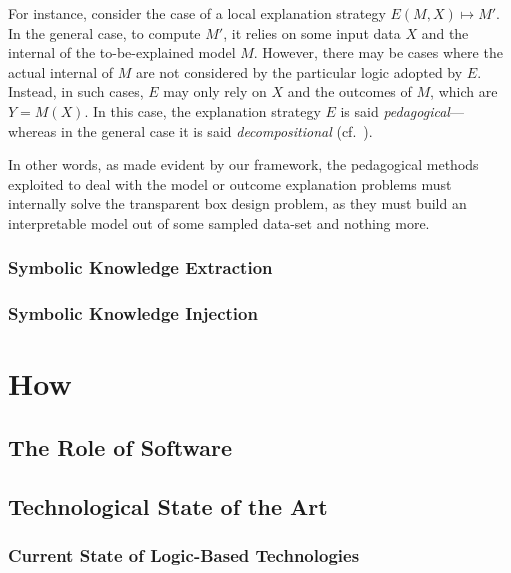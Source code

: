 \documentclass[12pt,a4paper,openright,twoside]{book}
\begin{document}
For instance, consider the case of a local explanation strategy $E(M, X) \mapsto M'$.
%
In the general case, to compute $M'$, it relies on some input data $X$ and the internal of the to-be-explained model $M$.
%
However, there may be cases where the actual internal of $M$ are not considered by the particular logic adopted by $E$.
%
Instead, in such cases, $E$ may only rely on $X$ and the outcomes of $M$, which are $Y = M(X)$.
%
In this case, the explanation strategy $E$ is said \emph{pedagogical}---whereas in the general case it is said \emph{decompositional} (cf.\ \cite{AndrewsDT95}).

In other words, as made evident by our framework, the pedagogical methods exploited to deal with the model or outcome explanation problems must internally solve the transparent box design problem, as they must build an interpretable model out of some sampled data-set and nothing more.

\section{Symbolic Knowledge Extraction}

\cite{shallow2deep-extraamas2021}
\cite{xailp-woa2019}

\section{Symbolic Knowledge Injection}

\cite{nsc4xai-woa2020}

\part{How}
\label{part:how}

\chapter{The Role of Software}

\chapter{Technological State of the Art}

\cite{coordination-jlamp2020}

\section{Current State of Logic-Based Technologies}
\end{document}
